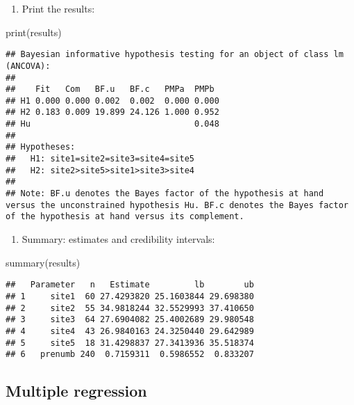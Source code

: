 \documentclass[
]{book}
\newenvironment{Shaded}{\begin{snugshade}}{\end{snugshade}}
\newcommand{\FunctionTok}[1]{\textcolor[rgb]{0.00,0.00,0.00}{#1}}
\newcommand{\NormalTok}[1]{#1}
\providecommand{\tightlist}{%
  \setlength{\itemsep}{0pt}\setlength{\parskip}{0pt}}
\begin{document}
\begin{enumerate}
\def\labelenumi{\arabic{enumi})}
\setcounter{enumi}{3}
\tightlist
\item
  Print the results:
\end{enumerate}

\begin{Shaded}
\begin{Highlighting}[]
\FunctionTok{print}\NormalTok{(results)}
\end{Highlighting}
\end{Shaded}

\begin{verbatim}
## Bayesian informative hypothesis testing for an object of class lm (ANCOVA):
## 
##    Fit   Com   BF.u   BF.c   PMPa  PMPb 
## H1 0.000 0.000 0.002  0.002  0.000 0.000
## H2 0.183 0.009 19.899 24.126 1.000 0.952
## Hu                                 0.048
## 
## Hypotheses:
##   H1: site1=site2=site3=site4=site5
##   H2: site2>site5>site1>site3>site4
## 
## Note: BF.u denotes the Bayes factor of the hypothesis at hand versus the unconstrained hypothesis Hu. BF.c denotes the Bayes factor of the hypothesis at hand versus its complement.
\end{verbatim}

\begin{enumerate}
\def\labelenumi{\arabic{enumi})}
\setcounter{enumi}{4}
\tightlist
\item
  Summary: estimates and credibility intervals:
\end{enumerate}

\begin{Shaded}
\begin{Highlighting}[]
\FunctionTok{summary}\NormalTok{(results)}
\end{Highlighting}
\end{Shaded}

\begin{verbatim}
##   Parameter   n   Estimate         lb        ub
## 1     site1  60 27.4293820 25.1603844 29.698380
## 2     site2  55 34.9818244 32.5529993 37.410650
## 3     site3  64 27.6904082 25.4002689 29.980548
## 4     site4  43 26.9840163 24.3250440 29.642989
## 5     site5  18 31.4298837 27.3413936 35.518374
## 6   prenumb 240  0.7159311  0.5986552  0.833207
\end{verbatim}

\hypertarget{multiple-regression}{%
\subsection{Multiple regression}\label{multiple-regression}}
\end{document}
